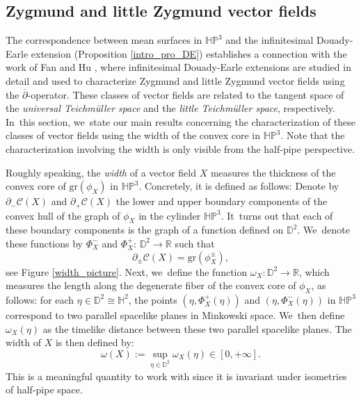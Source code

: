 \documentclass[JEP,XML,SOM,Unicode,NoEqCountersInSection, NoFloatCountersInSection,published]{cedram}
\theoremstyle{plain}
\theoremstyle{definition}
\newcommand{\HP}{\mathbb{HP}^3}
\begin{document}
\subsection{Zygmund and little Zygmund vector fields}

The correspondence between mean surfaces in \(\HP \) and the infinitesimal Douady-Earle extension (Proposition \ref{intro_pro_DE}) establishes a connection with the work of Fan and Hu \cite{Fan_Hu_Little}, where infinitesimal Douady-Earle extensions are studied in detail and used to characterize Zygmund and little Zygmund vector fields using the \(\overline{\partial}\)-operator. These classes of vector fields are related to the tangent space of the \emph{universal Teichmüller space} and the \emph{little Teichmüller space}, respectively. In~this section, we~state our main results concerning the characterization of these classes of vector fields using the width of the convex core in \(\HP \). Note that the characterization involving the width is only visible from the half-pipe perspective.

Roughly speaking, the \emph{width} of a vector field \(X \) measures the thickness of the convex core of \(\mathrm{gr}(\phi_X) \) in \(\HP \). Concretely, it is defined as follows: Denote by \(\partial_{-}\mathcal{C}(X) \) and \(\partial_+\mathcal{C}(X) \) the lower and upper boundary components of the convex hull of the graph of \(\phi_X \) in the cylinder \(\HP \). It~turns out that each of these boundary components is the graph of a function defined on \(\mathbb{D}^2 \). We~denote these functions by \(\Phi_X^- \) and \(\Phi_X^+ \): \(\mathbb{D}^2 \to \mathbb{R} \) such that
\[
\partial_{\pm}\mathcal{C}(X) = \mathrm{gr}(\phi_X^{\pm}),
\]
see Figure \ref{width_picture}. Next, we~define the function \(\omega_X:\mathbb{D}^2\to\mathbb{R} \), which measures the length along the degenerate fiber of the convex core of \(\phi_X \), as follows: for each \(\eta \in \mathbb{D}^2 \cong \mathbb{H}^2 \), the points \((\eta,\Phi_X^+(\eta)) \) and \((\eta,\Phi_X^-(\eta)) \) in \(\HP \) correspond to two parallel spacelike planes in Minkowski space. We~then define \(\omega_X(\eta) \) as the timelike distance between these two parallel spacelike planes. The width of \(X \) is then defined by:
\[
\omega(X) := \sup_{\eta\in\mathbb{D}^2} \omega_X(\eta)\in[0,+\infty].
\]
This is a meaningful quantity to work with since it is invariant under isometries of half-pipe space.
\end{document}
